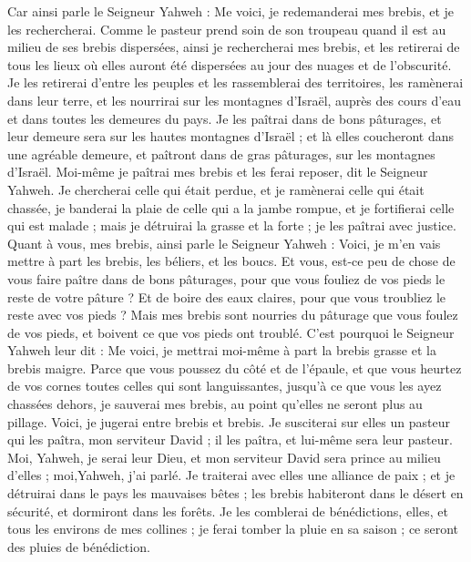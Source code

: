 \begin{multicols}{2}
Car ainsi parle le Seigneur Yahweh : Me voici, je redemanderai mes brebis, et je les rechercherai.
Comme le pasteur prend soin de son troupeau quand il est au milieu de ses brebis dispersées, ainsi je rechercherai mes brebis, et les retirerai de tous les lieux où elles auront été dispersées au jour des nuages et de l'obscurité.
Je les retirerai d'entre les peuples et les rassemblerai des territoires, les ramènerai dans leur terre, et les nourrirai sur les montagnes d'Israël, auprès des cours d’eau et dans toutes les demeures du pays.
Je les paîtrai dans de bons pâturages, et leur demeure sera sur les hautes montagnes d'Israël ; et là elles coucheront dans une agréable demeure, et paîtront dans de gras pâturages, sur les montagnes d'Israël.
Moi-même je paîtrai mes brebis et les ferai reposer, dit le Seigneur Yahweh.
Je chercherai celle qui était perdue, et je ramènerai celle qui était chassée, je banderai la plaie de celle qui a la jambe rompue, et je fortifierai celle qui est malade ; mais je détruirai la grasse et la forte ; je les paîtrai avec justice.
Quant à vous, mes brebis, ainsi parle le Seigneur Yahweh : Voici, je m'en vais mettre à part les brebis, les béliers, et les boucs.
Et vous, est-ce peu de chose de  vous faire paître dans de bons pâturages, pour que vous fouliez de vos pieds le reste de votre pâture ? Et de boire des eaux claires, pour que vous troubliez le reste avec vos pieds ?
Mais mes brebis sont nourries du pâturage que vous foulez de vos pieds, et boivent ce que vos pieds ont troublé.
C'est pourquoi le Seigneur Yahweh leur dit : Me voici, je mettrai moi-même à part la brebis grasse et la brebis maigre.
Parce que vous poussez du côté et de l'épaule, et que vous heurtez de vos cornes toutes celles qui sont languissantes, jusqu'à ce que vous les ayez chassées dehors,
je sauverai mes brebis, au point qu'elles ne seront plus au pillage. Voici, je jugerai entre brebis et brebis.
Je susciterai sur elles un pasteur qui les paîtra, mon serviteur David ; il les paîtra, et lui-même sera leur pasteur.
Moi, Yahweh, je serai leur Dieu, et mon serviteur David sera prince au milieu d'elles ; moi,Yahweh, j'ai parlé.
Je traiterai avec elles une alliance de paix ; et je détruirai dans le pays les mauvaises bêtes ; les brebis habiteront dans le désert en sécurité, et dormiront dans les forêts.
Je les comblerai de bénédictions, elles, et tous les environs de mes collines ; je ferai tomber la pluie en sa saison ; ce seront des pluies de bénédiction.

\end{multicols}
